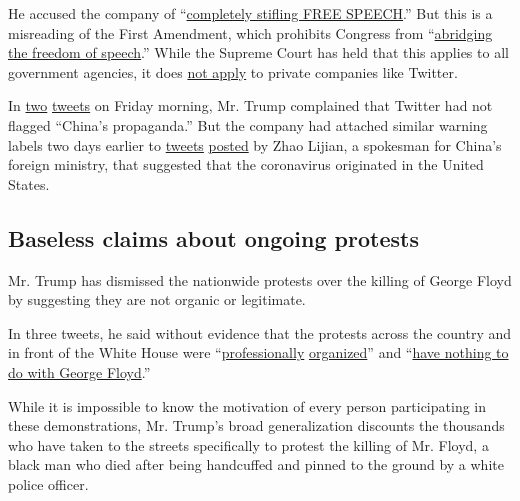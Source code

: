 He accused the company of
``\href{https://twitter.com/realDonaldTrump/status/1265427539008380928}{completely
stifling FREE SPEECH}.'' But this is a misreading of the First
Amendment, which prohibits Congress from
``\href{https://constitutioncenter.org/interactive-constitution/amendment/amendment-i}{abridging
the freedom of speech}.'' While the Supreme Court has held that this
applies to all government agencies, it does
\href{https://constitutioncenter.org/interactive-constitution/interpretation/amendment-i/interps/266}{not
apply} to private companies like Twitter.

In
\href{https://twitter.com/realDonaldTrump/status/1266326065833824257}{two}
\href{https://twitter.com/realDonaldTrump/status/1266346957611708417}{tweets}
on Friday morning, Mr. Trump complained that Twitter had not flagged
``China's propaganda.'' But the company had attached similar warning
labels two days earlier to
\href{https://twitter.com/zlj517/status/1238111898828066823?ref_src=twsrc\%5Etfw\%7Ctwcamp\%5Etweetembed\%7Ctwterm\%5E1238111898828066823\%7Ctwgr\%5E\&ref_url=https\%3A\%2F\%2Fwww.hindustantimes.com\%2Fworld-news\%2Ftwitter-flags-china-spokesman-s-tweet-on-covid-19\%2Fstory-FzULY6y660dBJ1coEl2khI.html}{tweets}
\href{https://twitter.com/zlj517/status/1238269193427906560?lang=en}{posted}
by Zhao Lijian, a spokesman for China's foreign ministry, that suggested
that the coronavirus originated in the United States.

\hypertarget{baseless-claims-about-ongoing-protests}{%
\subsection{Baseless claims about ongoing
protests}\label{baseless-claims-about-ongoing-protests}}

Mr. Trump has dismissed the nationwide protests over the killing of
George Floyd by suggesting they are not organic or legitimate.

In three tweets, he said without evidence that the protests across the
country and in front of the White House were
``\href{https://twitter.com/realDonaldTrump/status/1266724553620930561}{professionally}
\href{https://twitter.com/realDonaldTrump/status/1266711221836931072}{organized}''
and
``\href{https://twitter.com/realDonaldTrump/status/1266731291917062145}{have
nothing to do with George Floyd}.''

While it is impossible to know the motivation of every person
participating in these demonstrations, Mr. Trump's broad generalization
discounts the thousands who have taken to the streets specifically to
protest the killing of Mr. Floyd, a black man who died after being
handcuffed and pinned to the ground by a white police officer.

